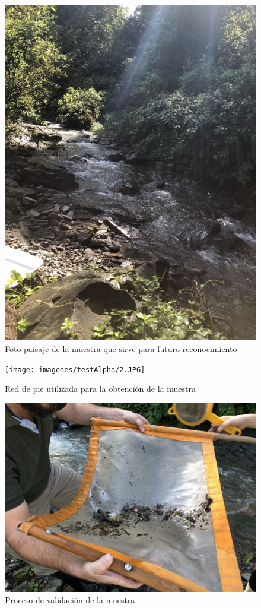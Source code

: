 		\begin{figure}[H]
			\centering
				\includegraphics[width=1\textwidth]{imagenes/testAlpha/1.JPG}
					\caption{Foto paisaje de la muestra que sirve para futuro reconocimiento}
		\end{figure}
		\begin{figure}[H]
			\centering
				\texttt{[image: imagenes/testAlpha/2.JPG]}
					\caption{Red de pie utilizada para la obtención de la muestra}
		\end{figure}
		\begin{figure}[H]
			\centering
				\includegraphics[width=1\textwidth]{imagenes/testAlpha/3.JPG}
					\caption{Proceso de validación de la muestra}
		\end{figure}
